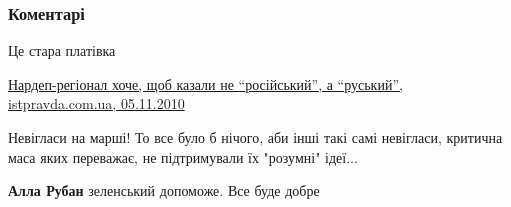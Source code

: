  
 
 
 
 
\subsubsection{Коментарі}

\begin{itemize}
 

Це стара платівка

\href{https://www.istpravda.com.ua/short/4cd425315d176/}{%
Нардеп-регіонал хоче, щоб казали не \enquote{російський}, а \enquote{руський}, istpravda.com.ua, 05.11.2010%
}

 

Невігласи на марші! То все було б нічого, аби інші такі самі невігласи,
критична маса яких переважає, не підтримували їх "розумні" ідеї... 🙁

\begin{itemize}
 
\textbf{Алла Рубан} зеленський допоможе. Все буде добре

\begin{itemize}
 

\end{itemize}
\end{itemize}
\end{itemize}
